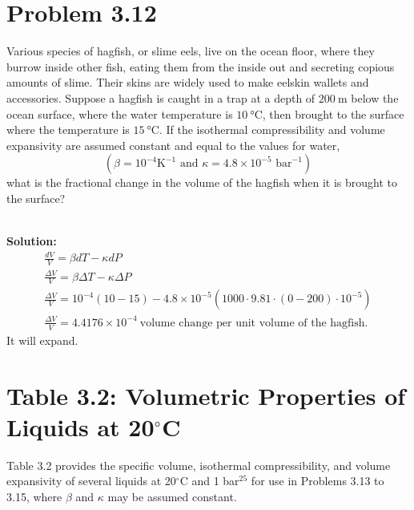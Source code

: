 \documentclass{article}
\newenvironment{solution}{\par\noindent\textbf{\\Solution:\\}}{\par\medskip}
\begin{document}
\section*{Problem 3.12}
Various species of hagfish, or slime eels, live on the ocean floor, where they burrow inside other fish, eating them from the inside out and secreting copious amounts of slime. Their skins are widely used to make eelskin wallets and accessories. Suppose a hagfish is caught in a trap at a depth of $200~\unit{ \meter }$ below the ocean surface, where the water temperature is $10~\unit{ \degreeCelsius }$, then brought to the surface where the temperature is $15~\unit{ \degreeCelsius }$. If the isothermal compressibility and volume expansivity are assumed constant and equal to the values for water,
$$ (\beta = 10^{-4} \text{K}^{-1} \text{ and } \kappa = 4.8 \times 10^{-5} \text{ bar}^{-1}) $$
what is the fractional change in the volume of the hagfish when it is brought to the surface?

\begin{solution}
    \begin{gather*}
          \frac{dV}{V}=\beta dT-\kappa dP\\
          \frac{\Delta V}{V}=\beta \Delta T-\kappa \Delta P\\
          \frac{\Delta V}{V}=10^{-4}\left( 10-15 \right)-4.8\times10^{-5}\left( 1000\cdot9.81\cdot\left( 0-200 \right)\cdot10^{-5} \right)\\
          \boxed{ \frac{\Delta V}{V}=4.4176\times10^{-4}~\text{volume change per unit volume of the hagfish.} }
    \end{gather*}
    It will expand.
\end{solution}

\section*{Table 3.2: Volumetric Properties of Liquids at 20$^\circ$C}
Table 3.2 provides the specific volume, isothermal compressibility, and volume expansivity of several liquids at 20$^\circ$C and 1 bar$^{25}$ for use in Problems 3.13 to 3.15, where $\beta$ and $\kappa$ may be assumed constant.
\end{document}

